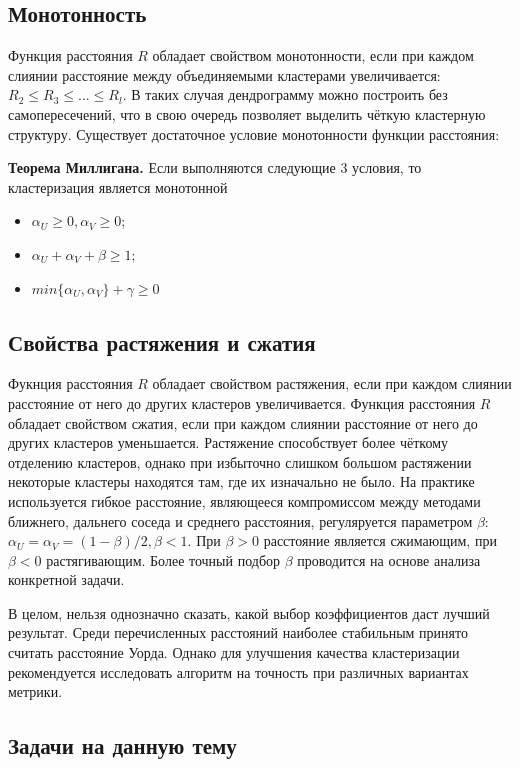 \begin{itemize}
\subsection*{Монотонность}

Функция расстояния $R$ обладает свойством монотонности, если при каждом слиянии расстояние между объединяемыми кластерами увеличивается: $R_2 \leq R_3 \leq...\leq R_l$. В таких случая дендрограмму можно построить без самопересечений, что в свою очередь позволяет выделить чёткую кластерную структуру. Существует достаточное условие монотонности функции расстояния:

\textbf{Теорема Миллигана.} Если выполняются следующие 3 условия, то кластеризация является монотонной
\begin{itemize}
    \item $\alpha_U \geq 0, \alpha_V \geq 0$;
    \item $\alpha_U + \alpha_V + \beta \geq 1;$
    \item $min \{{\alpha_U, \alpha_V}\} + \gamma \geq 0$
\end{itemize}

\subsection{Свойства растяжения и сжатия}

Фукнция расстояния $R$ обладает свойством растяжения, если при каждом слиянии расстояние от него до других кластеров увеличивается. Функция расстояния $R$ обладает свойством сжатия, если при каждом слиянии расстояние от него до других кластеров уменьшается. Растяжение способствует более чёткому отделению кластеров, однако при избыточно слишком большом растяжении некоторые кластеры находятся там, где их изначально не было. На практике используется гибкое расстояние, являющееся компромиссом между методами ближнего, дальнего соседа и среднего расстояния, регуляруется параметром $\beta$: $\alpha_U = \alpha_V = (1 - \beta)/2, \beta < 1$. При $\beta > 0$ расстояние является сжимающим, при $\beta < 0$ растягивающим. Более точный подбор $\beta$ проводится на основе анализа конкретной задачи. 

В целом, нельзя однозначно сказать, какой выбор коэффициентов даст лучший результат. Среди перечисленных расстояний наиболее стабильным принято считать расстояние Уорда. Однако для улучшения качества кластеризации рекомендуется исследовать алгоритм на точность при различных вариантах метрики. 

\subsection*{Задачи на данную тему}


\end{itemize}
